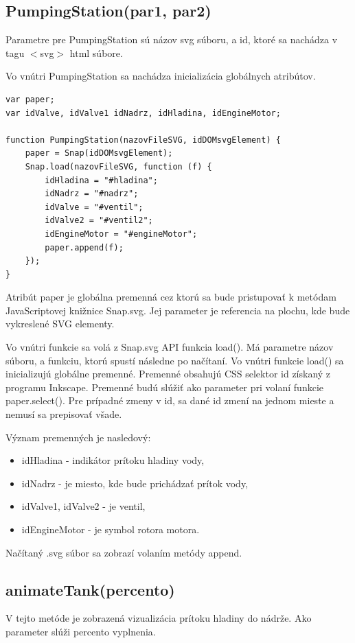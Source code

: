 \subsection{PumpingStation(par1, par2)}

Parametre pre PumpingStation sú názov svg súboru, a id, ktoré sa nachádza v tagu $<$svg$>$ html súbore.

Vo vnútri PumpingStation sa nachádza inicializácia globálnych atribútov. 
\begin{lstlisting}[language = HTML]
var paper;
var idValve, idValve1 idNadrz, idHladina, idEngineMotor;

function PumpingStation(nazovFileSVG, idDOMsvgElement) {
	paper = Snap(idDOMsvgElement);
	Snap.load(nazovFileSVG, function (f) {
		idHladina = "#hladina";
		idNadrz = "#nadrz";
		idValve = "#ventil";
		idValve2 = "#ventil2";
		idEngineMotor = "#engineMotor";
		paper.append(f);
	});
}
\end{lstlisting}

Atribút paper je globálna premenná cez ktorú sa bude pristupovať k metódam JavaScriptovej knižnice Snap.svg. Jej parameter je referencia na plochu, kde bude vykreslené SVG elementy.

Vo vnútri funkcie sa volá z Snap.svg API funkcia load(). Má parametre názov súboru, a funkciu, ktorú spustí následne po načítaní. 
Vo vnútri funkcie load() sa inicializujú globálne premenné.  
Premenné obsahujú CSS selektor id získaný z programu Inkscape. Premenné budú slúžiť ako parameter pri volaní funkcie paper.select(). Pre prípadné zmeny v id, sa dané id zmení na jednom mieste a nemusí sa prepisovať všade. 

Význam premenných je nasledový: 
\begin{itemize}
	\item idHladina - indikátor prítoku hladiny vody, 
	\item idNadrz - je miesto, kde bude prichádzať prítok vody,
	\item idValve1, idValve2 - je ventil, 
	\item idEngineMotor - je symbol rotora motora.
\end{itemize}

Načítaný .svg súbor sa zobrazí volaním metódy append. 

\subsection{animateTank(percento)}
V tejto metóde je zobrazená vizualizácia prítoku hladiny do nádrže. Ako parameter slúži percento vyplnenia. 

